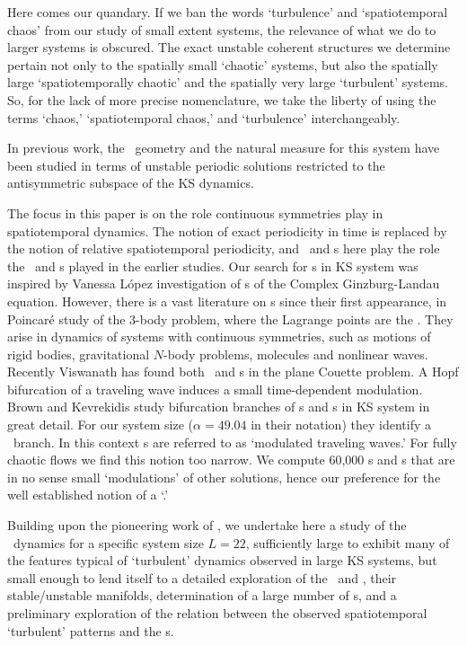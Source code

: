 {
Here comes our quandary. If we ban the words `turbulence' and
`spatiotemporal chaos' from our study of small extent
systems, the relevance of what we do to larger systems is
obscured. The exact unstable coherent structures we determine
pertain not only to the spatially small `chaotic' systems,
but also the spatially large `spatiotemporally chaotic' and
the spatially very large `turbulent' systems.
So, for the lack of more precise nomenclature, we take the
liberty of using the terms `chaos,' `spatiotemporal chaos,'
and `turbulence' interchangeably.
} %


In previous work, the \statesp\ geometry and the natural measure for
this system have been
studied in terms of unstable
periodic solutions restricted to the antisymmetric subspace of the
KS dynamics.

The focus in this paper is on the role continuous symmetries
play in spatiotemporal dynamics. The notion of exact
periodicity in time is replaced by the notion of relative
spatiotemporal periodicity, and \reqva\ and \rpo s here play
the role the \eqva\ and \po s played in the earlier studies.
Our search for \rpo s in KS system was inspired by Vanessa
L{\'o}pez investigation of {\rpo s} of the
Complex Ginzburg-Landau equation.  However, there is a vast
literature on {\rpo s} since their first appearance, in
Poincar\'e study of the 3-body problem,
where the Lagrange points are the \reqva.  They arise in
dynamics of systems with continuous symmetries, such as
motions of rigid bodies, gravitational $N$-body problems,
molecules and nonlinear waves. Recently Viswanath
has found both \reqva\ and \rpo s in
the plane Couette problem.
    {
A Hopf bifurcation of a traveling
wave induces a small
time-dependent modulation. Brown and Kevrekidis
study bifurcation branches of \po s and \rpo s in KS system
in great detail. For our system size ($\alpha=49.04$ in their
notation) they identify a \po\  branch. In this
context \rpo s are referred to as `modulated traveling
waves.' For fully chaotic flows we find this notion too
narrow. We compute 60,000 \po s and \rpo s that are in no
sense small `modulations' of other solutions, hence our
preference for the well established notion of a `\rpo.'
          }

Building upon the pioneering work of
, we undertake here a
study of the \KS\ dynamics for a specific system size $L =
22$, sufficiently large to exhibit many of the features
typical of `turbulent' dynamics observed in large KS systems,
but small enough to lend itself to a detailed exploration of
the  \eqva\ and \reqva, their stable/unstable manifolds,
determination of a large number of \rpo s, and a preliminary
exploration of the relation between the observed
spatiotemporal `turbulent' patterns and the \rpo s.

